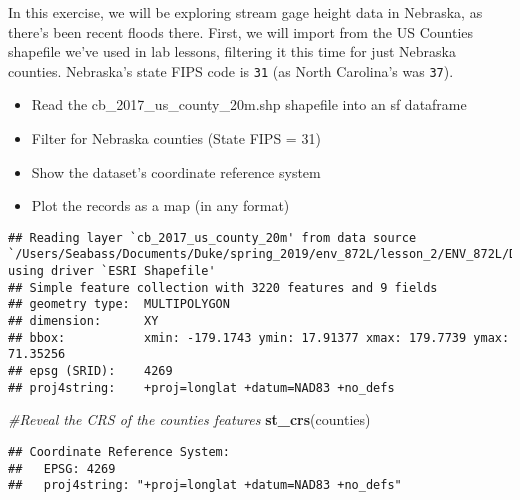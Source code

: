 \documentclass[]{article}
\newenvironment{Shaded}{\begin{snugshade}}{\end{snugshade}}
\newcommand{\KeywordTok}[1]{\textcolor[rgb]{0.13,0.29,0.53}{\textbf{#1}}}
\newcommand{\DecValTok}[1]{\textcolor[rgb]{0.00,0.00,0.81}{#1}}
\newcommand{\StringTok}[1]{\textcolor[rgb]{0.31,0.60,0.02}{#1}}
\newcommand{\CommentTok}[1]{\textcolor[rgb]{0.56,0.35,0.01}{\textit{#1}}}
\newcommand{\OperatorTok}[1]{\textcolor[rgb]{0.81,0.36,0.00}{\textbf{#1}}}
\newcommand{\NormalTok}[1]{#1}
\providecommand{\tightlist}{%
  \setlength{\itemsep}{0pt}\setlength{\parskip}{0pt}}
\begin{document}
In this exercise, we will be exploring stream gage height data in
Nebraska, as there's been recent floods there. First, we will import
from the US Counties\\
shapefile we've used in lab lessons, filtering it this time for just
Nebraska counties. Nebraska's state FIPS code is \texttt{31} (as North
Carolina's was \texttt{37}).

\begin{itemize}
\tightlist
\item
  Read the cb\_2017\_us\_county\_20m.shp shapefile into an sf dataframe
\item
  Filter for Nebraska counties (State FIPS = 31)
\item
  Show the dataset's coordinate reference system
\item
  Plot the records as a map (in any format)
\end{itemize}

\begin{Shaded}
\end{Shaded}

\begin{verbatim}
## Reading layer `cb_2017_us_county_20m' from data source `/Users/Seabass/Documents/Duke/spring_2019/env_872L/lesson_2/ENV_872L/Data/Spatial/cb_2017_us_county_20m.shp' using driver `ESRI Shapefile'
## Simple feature collection with 3220 features and 9 fields
## geometry type:  MULTIPOLYGON
## dimension:      XY
## bbox:           xmin: -179.1743 ymin: 17.91377 xmax: 179.7739 ymax: 71.35256
## epsg (SRID):    4269
## proj4string:    +proj=longlat +datum=NAD83 +no_defs
\end{verbatim}

\begin{Shaded}
\begin{Highlighting}[]
\CommentTok{#Reveal the CRS of the counties features}
\KeywordTok{st_crs}\NormalTok{(counties)}
\end{Highlighting}
\end{Shaded}

\begin{verbatim}
## Coordinate Reference System:
##   EPSG: 4269 
##   proj4string: "+proj=longlat +datum=NAD83 +no_defs"
\end{verbatim}
\end{document}
